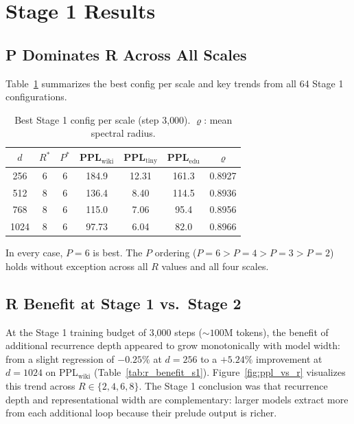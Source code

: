 \documentclass{article}
\newcommand{\pplwiki}{PPL$_\text{wiki}$}
\newcommand{\ppltiny}{PPL$_\text{tiny}$}
\newcommand{\ppledu}{PPL$_\text{edu}$}
\begin{document}
\section{Stage 1 Results}
\label{sec:stage1}

\subsection{P Dominates R Across All Scales}

Table~\ref{tab:stage1_best} summarizes the best config per scale and key trends from all 64 Stage 1 configurations.

\begin{table}[htbp]
\centering
\caption{Best Stage 1 config per scale (step 3{,}000). $\varrho$: mean spectral radius.}
\label{tab:stage1_best}
\footnotesize
\begin{tabular}{ccccccc}
\toprule
$d$ & $R^*$ & $P^*$ & \pplwiki & \ppltiny & \ppledu & $\varrho$ \\
\midrule
256 & 6 & 6 & 184.9 & 12.31 & 161.3 & 0.8927 \\
512 & 8 & 6 & 136.4 & 8.40  & 114.5 & 0.8936 \\
768 & 8 & 6 & 115.0 & 7.06  & 95.4  & 0.8956 \\
1024 & 8 & 6 & 97.73 & 6.04  & 82.0  & 0.8966 \\
\bottomrule
\end{tabular}
\end{table}

In every case, $P=6$ is best. The $P$ ordering ($P=6 > P=4 > P=3 > P=2$) holds without exception across all $R$ values and all four scales.

\subsection{R Benefit at Stage 1 vs.\ Stage 2}

At the Stage 1 training budget of 3{,}000 steps ($\sim 100$M tokens), the benefit of additional recurrence depth appeared to grow monotonically with model width: from a slight regression of $-0.25\%$ at $d{=}256$ to a $+5.24\%$ improvement at $d{=}1024$ on \pplwiki{} (Table~\ref{tab:r_benefit_s1}). Figure~\ref{fig:ppl_vs_r} visualizes this trend across $R \in \{2, 4, 6, 8\}$. The Stage 1 conclusion was that recurrence depth and representational width are complementary: larger models extract more from each additional loop because their prelude output is richer.
\end{document}
